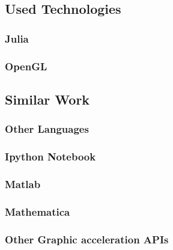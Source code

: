 \subsection{Used Technologies}

\subsubsection{Julia}
\subsubsection{OpenGL}


\subsection{Similar Work}

\subsubsection{Other Languages}
\subsubsection{Ipython Notebook}
\subsubsection{Matlab}
\subsubsection{Mathematica}
\subsubsection{Other Graphic acceleration APIs}